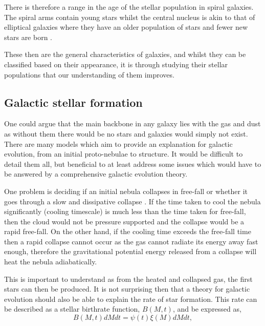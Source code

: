 \documentclass[12pt, twocolumn]{revtex4}    %
\begin{document}
There is therefore a range in the age of the stellar population in spiral galaxies. The spiral arms contain young stars whilst the central nucleus is akin to that of elliptical galaxies where they have an older population of stars and fewer new stars are born \citep{carroll_astro, binney_galaxies}.

These then are the general characteristics of galaxies, and whilst they can be classified based on their appearance, it is through studying their stellar populations that our understanding of them improves. 


\subsection{Galactic stellar formation}


One could argue that the main backbone in any galaxy lies with the gas and dust as without them there would be no stars and galaxies would simply not exist. There are many models which aim to provide an explanation for galactic evolution, from an initial proto-nebulae to structure. It would be difficult to detail them all, but beneficial to at least address some issues which would have to be answered by a comprehensive galactic evolution theory. 

One problem is deciding if an initial nebula collapses in free-fall or whether it goes through a slow and dissipative collapse \citep{carroll_astro}. If the time taken to cool the nebula significantly (cooling timescale) is much less than the time taken for free-fall, then the cloud would not be pressure supported and the collapse would be a rapid free-fall. On the other hand, if the cooling time exceeds the free-fall time then a rapid collapse cannot occur as the gas cannot radiate its energy away fast enough, therefore the gravitational potential energy released from a collapse will heat the nebula adiabatically. 

This is important to understand as from the heated and collapsed gas, the first stars can then be produced. It is not surprising then that a theory for galactic evolution should also be able to explain the rate of star formation. This rate can be described as a stellar birthrate function, $B(M,t)$, and be expressed as,
\begin{equation}
B(M,t)dM dt = \psi (t) \xi (M) dM dt, 
\label{eqn:stellar_birth_rate}
\end{equation}
\end{document}
